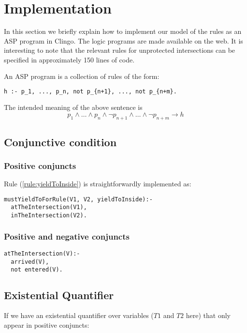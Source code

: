 \section{Implementation}
\label{sec:implementation}

In this section we briefly explain how to implement
our model of the rules as an ASP program in Clingo.
The logic programs are made available on the web\footnotemark[\ref{foot:link}].
It is interesting to note that the relevant rules for unprotected intersections can be specified in approximately 150 lines of code.

An ASP program is a collection of rules of the form:
\begin{verbatim}
h :- p_1, ..., p_n, not p_{n+1}, ..., not p_{n+m}.
\end{verbatim}
The intended meaning of the above sentence is
$$ p_1 \land \dots \land p_n \land  \neg p_{n+1} \land \dots \land \neg p_{n+m} \rightarrow h $$

\subsection{Conjunctive condition}
\subsubsection{Positive conjuncts}
Rule (\ref{rule:yieldToInside}) is straightforwardly implemented as:
\begin{verbatim}
mustYieldToForRule(V1, V2, yieldToInside):-
  atTheIntersection(V1),
  inTheIntersection(V2).
\end{verbatim}

\subsubsection{Positive and negative conjuncts}
\begin{verbatim}
atTheIntersection(V):-
  arrived(V),
  not entered(V).
\end{verbatim}

\subsection{Existential Quantifier}
If we have an existential quantifier
over variables ($T1$ and $T2$ here)
that only appear in positive conjuncts:

